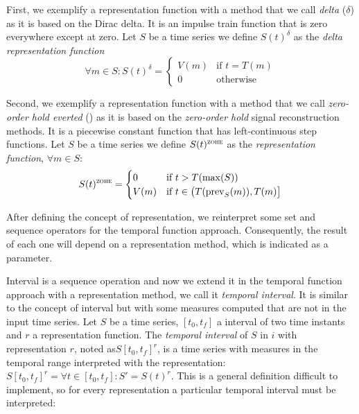First, we exemplify a representation function with a method that we
call \emph{delta} ($\delta$) as it is based on the Dirac delta. It is
an impulse train function that is zero everywhere except at zero.  Let
$S$ be a time series we define $S(t)^\delta$ as the \emph{delta
  representation function}
\[
    \forall m \in S: S(t)^\delta
    =  \begin{cases}
      V(m) & \text{if }  t=T(m) \\
      0 & \text{otherwise}
    \end{cases}
\]



Second, we exemplify a representation function with a method that we
call \emph{zero-order hold everted} (\zohe{}) as it is based on the
\emph{zero-order hold} signal reconstruction methods. It is a
piecewise constant function that has left-continuous step functions.
Let $S$ be a time series we define $S(t)^\zohe$ as the \emph{\zohe{}
  representation function}, $\forall m \in S:$
\[
    S(t)^\zohe 
    = \begin{cases}
      0 & \text{if }  t > T(\max(S)) \\
      V(m) & \text{if } t\in \big(T(\prev_S(m)),T(m)\big]
    \end{cases}
\]
  




After defining the concept of representation, we reinterpret some set
and sequence operators for the temporal function
approach. Consequently, the result of each one will depend on a
representation method, which is indicated as a parameter.



Interval is a sequence operation and now we extend it in the temporal
function approach with a representation method, we call it
\emph{temporal interval}. It is similar to the concept of interval but
with some measures computed that are not in the input time series.
Let $S$ be a time series, $[t_0,t_f]$ a interval
of two time instants and $r$ a representation function. The \emph{temporal
interval} of $S$ in $i$ with representation $r$, noted as$
S[t_0,t_f]^r$, is a time series with measures in the temporal range
interpreted with the representation: $S[t_0,t_f]^r= \forall t \in
[t_0,t_f] : S' = S(t)^r $. This is a general definition difficult to
implement, so for every representation a particular temporal interval
must be interpreted:

